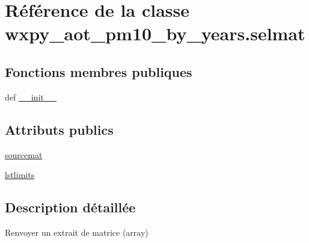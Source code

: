 \hypertarget{classwxpy__aot__pm10__by__years_1_1selmat}{\section{Référence de la classe wxpy\-\_\-aot\-\_\-pm10\-\_\-by\-\_\-years.\-selmat}
\label{classwxpy__aot__pm10__by__years_1_1selmat}
}
\subsection*{Fonctions membres publiques}
\begin{DoxyCompactItemize}
\item 
def \hyperlink{classwxpy__aot__pm10__by__years_1_1selmat_a71298a7382194b0646dedcc77bcd22ed}{\-\_\-\-\_\-init\-\_\-\-\_\-}
\end{DoxyCompactItemize}
\subsection*{Attributs publics}
\begin{DoxyCompactItemize}
\item 
\hyperlink{classwxpy__aot__pm10__by__years_1_1selmat_a63ae225a45883227129fecbf1b726c75}{sourcemat}
\item 
\hyperlink{classwxpy__aot__pm10__by__years_1_1selmat_a0538fd4db9267578887d2aba3c3629c3}{lstlimits}
\end{DoxyCompactItemize}


\subsection{Description détaillée}
\begin{DoxyVerb}Renvoyer un extrait de matrice (array) \end{DoxyVerb}
 

